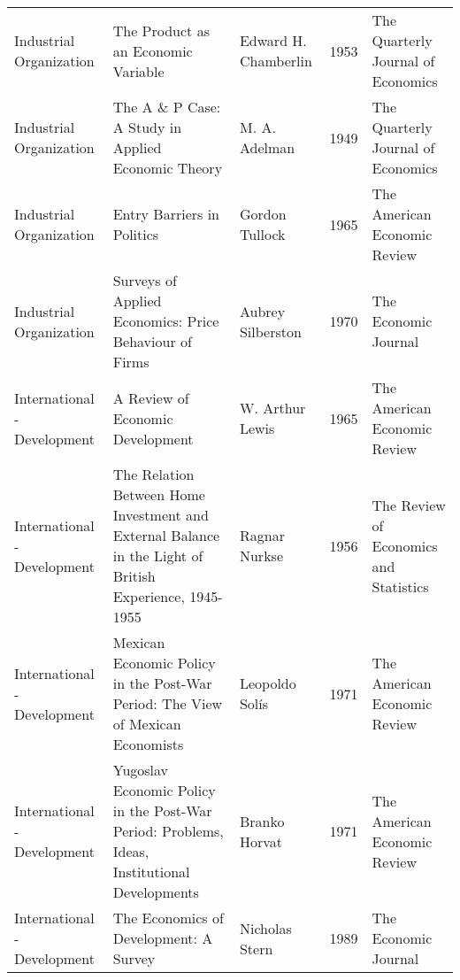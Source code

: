 \begin{xltabular}[p]{\hsize}{sYsrs}
        Industrial Organization &                                                                                             The Product as an Economic Variable &                                          Edward H. Chamberlin & 1953 &     The Quarterly Journal of Economics \\
        Industrial Organization &                                                                             The A \& P Case: A Study in Applied Economic Theory &                                                 M. A. Adelman & 1949 &     The Quarterly Journal of Economics \\
        Industrial Organization &                                                                                                      Entry Barriers in Politics &                                                Gordon Tullock & 1965 &           The American Economic Review \\
        Industrial Organization &                                                                          Surveys of Applied Economics: Price Behaviour of Firms &                                             Aubrey Silberston & 1970 &                   The Economic Journal \\
    International - Development &                                                                                                A Review of Economic Development &                                               W. Arthur Lewis & 1965 &           The American Economic Review \\
    International - Development &                         The Relation Between Home Investment and External Balance in the Light of British Experience, 1945-1955 &                                                 Ragnar Nurkse & 1956 & The Review of Economics and Statistics \\
    International - Development &                                                  Mexican Economic Policy in the Post-War Period: The View of Mexican Economists &                                                Leopoldo Solís & 1971 &           The American Economic Review \\
    International - Development &                                    Yugoslav Economic Policy in the Post-War Period: Problems, Ideas, Institutional Developments &                                                 Branko Horvat & 1971 &           The American Economic Review \\
    International - Development &                                                                                          The Economics of Development: A Survey &                                                Nicholas Stern & 1989 &                   The Economic Journal \\

\end{xltabular}

